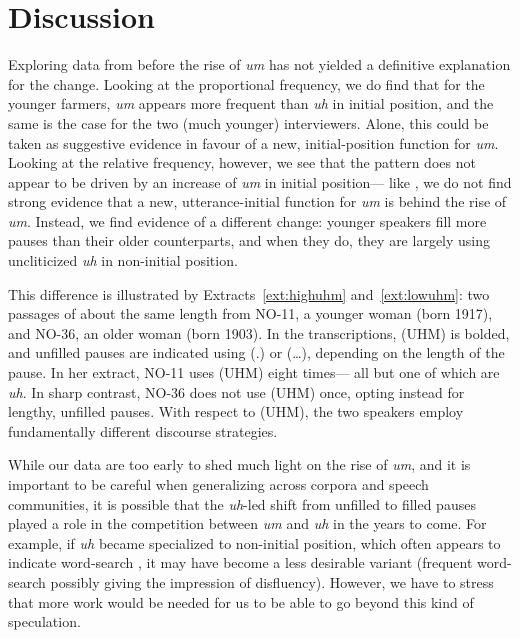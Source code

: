 \documentclass[11pt]{article}
\begin{document}
\section{Discussion}

Exploring data from before the rise of \emph{um} has not yielded a definitive
explanation for the change.
Looking at the proportional frequency, we do find that for the younger
farmers,
\emph{um} appears more frequent than \emph{uh} in initial position, and the same
is the case for the two (much younger) interviewers.
Alone, this could be taken as suggestive evidence in favour of a new,
initial-position function for \emph{um}.
Looking at the relative frequency, however, we see that the pattern does not
appear to be driven by an increase of \emph{um} in initial position---%
like \textcite{fruehwald2016}, we do not find strong evidence that a new,
utterance-initial function for \emph{um} is behind the rise of \emph{um}.
Instead, we find evidence of a different change:
younger speakers fill more pauses than their older counterparts, and when they
do, they are largely using uncliticized \emph{uh} in non-initial position.

This difference is illustrated by Extracts~\ref{ext:highuhm}
and~\ref{ext:lowuhm}:
two passages of about the same length from NO-11, a younger woman (born 1917),
and NO-36, an older woman (born 1903).
In the transcriptions, (UHM) is bolded, and unfilled pauses are indicated using
(.) or (\ldots), depending on the length of the pause.
In her extract, NO-11 uses (UHM) eight times---%
all but one of which are \emph{uh}.
In sharp contrast, NO-36 does not use (UHM) once, opting instead for lengthy,
unfilled pauses.
With respect to (UHM), the two speakers employ fundamentally different discourse
strategies.

While our data are too early to shed much light on the rise of \emph{um}, and it
is important to be careful when generalizing across corpora and speech
communities, it is possible that the \emph{uh}-led shift from unfilled to filled
pauses played a role in the competition between \emph{um} and \emph{uh} in the
years to come.
For example, if \emph{uh} became specialized to non-initial
position, which often appears to indicate word-search \parencite{tottie2016,
tottie2017}, it may have become a less desirable variant (frequent word-search
possibly giving the impression of disfluency).
However, we have to stress that more work would be needed for us to be able to
go beyond this kind of speculation.
\end{document}
